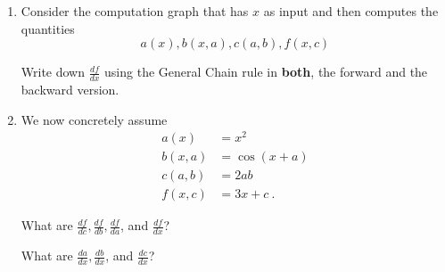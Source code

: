 








\begin{enumerate}
\item Consider the computation graph that has $x$ as input and then computes
the quantities
$$ a(x), b(x,a), c(a,b), f(x,c) $$

Write down $\frac{df}{dx}$ using the General Chain rule in \textbf{both}, the forward and the backward version.

\item We now concretely assume
%
\begin{align*}
a(x) &= x^2 \\
b(x,a) &= \cos(x+a) \\
c(a,b) &= 2ab \\
f(x,c) &= 3x + c ~.
\end{align*}

What are $\frac{df}{dc}, \frac{df}{db}, \frac{df}{da}$, and $\frac{df}{dx}$? 

What are $\frac{da}{dx}, \frac{db}{dx}$, and $\frac{dc}{dx}$?
\end{enumerate}

